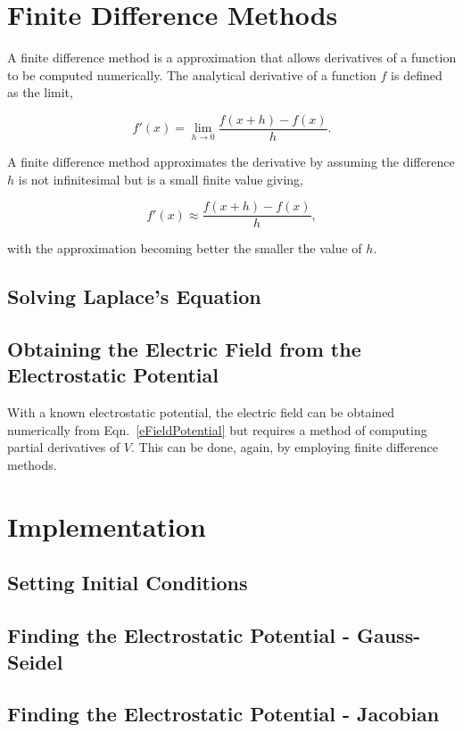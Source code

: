 \documentclass{article}
\begin{document}
\section{Finite Difference Methods}

A finite difference method is a approximation that allows derivatives of a function to be computed numerically. The analytical derivative of a function $f$ is defined as the limit,

$$
f'(x) = \lim_{h \to 0} \frac{f(x+h)-f(x)}{h}.
$$

A finite difference method approximates the derivative by assuming the difference $h$ is not infinitesimal but is a small finite value giving,

$$
f'(x) \approx \frac{f(x+h)-f(x)}{h},
$$

with the approximation becoming better the smaller the value of $h$.

\subsection{Solving Laplace's Equation}



\subsection{Obtaining the Electric Field from the Electrostatic Potential}

With a known electrostatic potential, the electric field can be obtained numerically from Eqn.~\ref{eFieldPotential} but requires a method of computing partial derivatives of $V$. This can be done, again, by employing finite difference methods.



\section{Implementation}

\subsection{Setting Initial Conditions}




\subsection{Finding the Electrostatic Potential - Gauss-Seidel}


\subsection{Finding the Electrostatic Potential - Jacobian}
\end{document}

